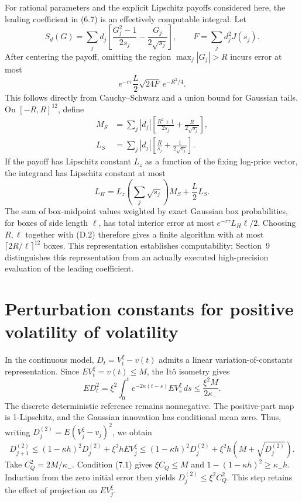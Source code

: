 For rational parameters and the explicit Lipschitz payoffs considered here, the leading
coefficient in (6.7) is an effectively computable integral. Let
\[
S_d(G)=\sum_jd_j\left[\frac{G_j^2-1}{2s_j}-\frac{G_j}{2\sqrt{s_j}}\right],
\qquad F=\sum_jd_j^2J(s_j).
\]
After centering the payoff, omitting the region \(\max_j|G_j|>R\) incurs error at most
\[
e^{-r\tau}\frac L2\sqrt{24F}\,e^{-R^2/4}.
\tag{D.2}
\]
This follows directly from Cauchy--Schwarz and a union bound for Gaussian tails.
On \([-R,R]^{12}\), define
\[
\begin{aligned}
M_S&=\sum_j|d_j|\left[\frac{R^2+1}{2s_j}+\frac R{2\sqrt{s_j}}\right],\\
L_S&=\sum_j|d_j|\left[\frac R{s_j}+\frac1{2\sqrt{s_j}}\right].
\end{aligned}
\]
If the payoff has Lipschitz constant \(L_z\) as a function of the fixing log-price vector,
the integrand has Lipschitz constant at most
\[
L_H=L_z\left(\sum_j\sqrt{s_j}\right)M_S+\frac L2L_S.
\]
The sum of box-midpoint values weighted by exact Gaussian box probabilities, for boxes
of side length \(\ell\), has total interior error at most
\(e^{-r\tau}L_H\ell/2\).
Choosing \(R,\ell\) together with (D.2) therefore gives a finite algorithm with at most
\(\lceil2R/\ell\rceil^{12}\) boxes.
This representation establishes computability; Section~9 distinguishes this
representation from an actually executed high-precision evaluation of the leading coefficient.

\section{Perturbation constants for positive volatility of volatility}

In the continuous model, \(D_t=V_t^\xi-v(t)\) admits a linear variation-of-constants
representation. Since \(EV_t^\xi=v(t)\le M\), the It\^o isometry gives
\[
ED_t^2=\xi^2\int_0^te^{-2\kappa(t-s)}EV_s^\xi\,ds
\le\frac{\xi^2M}{2\kappa_-}.
\tag{E.1}
\]
The discrete deterministic reference remains nonnegative.
The positive-part map is 1-Lipschitz, and the Gaussian innovation has conditional mean
zero. Thus, writing \(D_j^{(2)}=E(V_j^\xi-v_j)^2\), we obtain
\[
D_{j+1}^{(2)}
\le(1-\kappa h)^2D_j^{(2)}+\xi^2hEV_j^\xi
\le(1-\kappa h)^2D_j^{(2)}
+\xi^2h(M+\sqrt{D_j^{(2)}}).
\tag{E.2}
\]
Take \(C_Q^2=2M/\kappa_-\).
Condition (7.1) gives \(\xi C_Q\le M\) and
\(1-(1-\kappa h)^2\ge\kappa_-h\).
Induction from the zero initial error then yields
\(D_j^{(2)}\le\xi^2C_Q^2\).
This step retains the effect of projection on \(EV_j^\xi\).

